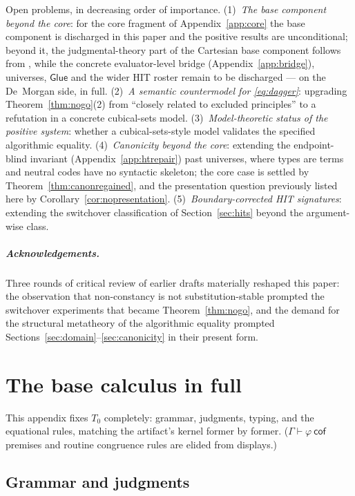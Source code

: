 \documentclass{lmcs}
\newcommand{\Glue}{\mathsf{Glue}}
\begin{document}
Open problems, in decreasing order of importance.
(1)~\emph{The base component beyond the core}: for the core fragment
of Appendix~\ref{app:core} the base component is discharged in this
paper and the positive results are unconditional; beyond it, the
judgmental-theory part of the Cartesian base component follows from
\cite{SterlingAngiuli}, while the concrete evaluator-level bridge
(Appendix~\ref{app:bridge}), universes, $\Glue$ and the wider HIT
roster remain to be discharged --- on the De~Morgan side, in full.
(2)~\emph{A semantic countermodel for \eqref{eq:dagger}}: upgrading
Theorem~\ref{thm:nogo}(2) from ``closely related to excluded
principles'' to a refutation in a concrete cubical-sets model.
(3)~\emph{Model-theoretic status of the positive system}: whether a
cubical-sets-style model validates the specified algorithmic
equality.
(4)~\emph{Canonicity beyond the core}: extending the
endpoint-blind invariant (Appendix~\ref{app:htrepair}) past
universes, where types are terms and neutral codes have no
syntactic skeleton; the core case is settled by
Theorem~\ref{thm:canonregained}, and the presentation question
previously listed here by Corollary~\ref{cor:nopresentation}.
(5)~\emph{Boundary-corrected HIT signatures}: extending the
switchover classification of Section~\ref{sec:hits} beyond the
argument-wise class.

\subparagraph*{Acknowledgements.}  Three rounds of critical review of
earlier drafts materially reshaped this paper: the observation that
non-constancy is not substitution-stable prompted the switchover
experiments that became Theorem~\ref{thm:nogo}, and the demand for
the structural metatheory of the algorithmic equality prompted
Sections~\ref{sec:domain}--\ref{sec:canonicity} in their present
form.

\appendix

\section{The base calculus in full}
\label{app:rules}

This appendix fixes $T_0$ completely: grammar, judgments, typing,
and the equational rules, matching the artifact's kernel former by
former.  ($\Gamma \vdash \varphi\ \mathsf{cof}$ premises and routine
congruence rules are elided from displays.)

\subsection{Grammar and judgments}
\end{document}
